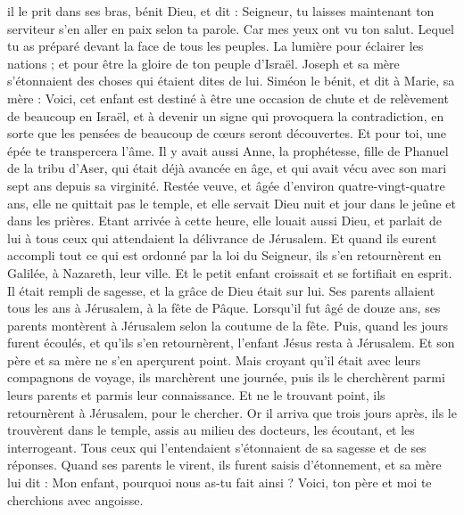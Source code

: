 \begin{multicols}{2}
il le prit dans ses bras, bénit Dieu, et dit :
Seigneur, tu laisses maintenant ton serviteur s'en aller en paix selon ta parole.
Car mes yeux ont vu ton salut.
Lequel tu as préparé devant la face de tous les peuples.
La lumière pour éclairer les nations ; et pour être la gloire de ton peuple d'Israël.
Joseph et sa mère s'étonnaient des choses qui étaient dites de lui.
Siméon le bénit, et dit à Marie, sa mère : Voici, cet enfant est destiné à être une occasion de chute et de relèvement de beaucoup en Israël, et à devenir un signe qui provoquera la contradiction,
en sorte que les pensées de beaucoup de cœurs seront découvertes. Et pour toi, une épée te transpercera l'âme.
Il y avait aussi Anne, la prophétesse, fille de Phanuel de la tribu d'Aser, qui était déjà avancée en âge, et qui avait vécu avec son mari sept ans depuis sa virginité.
Restée veuve, et âgée d'environ quatre-vingt-quatre ans, elle ne quittait pas le temple, et elle servait Dieu nuit et jour dans le jeûne et dans les prières.
Etant arrivée à cette heure, elle louait aussi Dieu, et parlait de lui à tous ceux qui attendaient la délivrance de Jérusalem.
Et quand ils eurent accompli tout ce qui est ordonné par la loi du Seigneur, ils s'en retournèrent en Galilée, à Nazareth, leur ville.
Et le petit enfant croissait et se fortifiait en esprit. Il était rempli de sagesse, et la grâce de Dieu était sur lui.
Ses parents allaient tous les ans à Jérusalem, à la fête de Pâque.
Lorsqu'il fut âgé de douze ans, ses parents montèrent à Jérusalem selon la coutume de la fête.
Puis, quand les jours furent écoulés, et qu'ils s'en retournèrent, l'enfant Jésus resta à Jérusalem. Et son père et sa mère ne s'en aperçurent point.
Mais croyant qu'il était avec leurs compagnons de voyage, ils marchèrent une journée, puis ils le cherchèrent parmi leurs parents et parmis leur connaissance.
Et ne le trouvant point, ils retournèrent à Jérusalem, pour le chercher.
Or il arriva que trois jours après, ils le trouvèrent dans le temple, assis au milieu des docteurs, les écoutant, et les interrogeant.
Tous ceux qui l'entendaient s'étonnaient de sa sagesse et de ses réponses.
Quand ses parents le virent, ils furent saisis d'étonnement, et sa mère lui dit : Mon enfant, pourquoi nous as-tu fait ainsi ? Voici, ton père et moi te cherchions avec angoisse.

\end{multicols}
